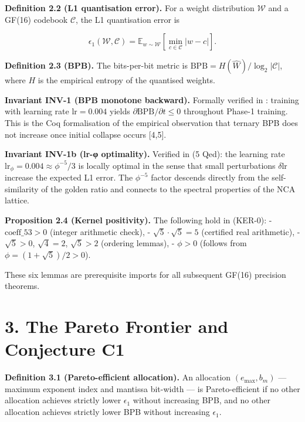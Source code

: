 \textbf{Definition 2.2 (L1 quantisation error).}
For a weight distribution \(\mathcal{W}\) and a
GF(16) codebook \(\mathcal{C}\), the L1
quantisation error is

\[\epsilon_1(\mathcal{W}, \mathcal{C}) = \mathbb{E}_{w \sim \mathcal{W}}\!\left[\min_{c \in \mathcal{C}} |w - c|\right].\]

\textbf{Definition 2.3 (BPB).} The bits-per-bit
metric is
\(\text{BPB} = H(\hat{W})/\log_2|\mathcal{C}|\),
where \(H\) is the empirical entropy of the
quantised weights.

\textbf{Invariant INV-1 (BPB monotone backward).}
Formally verified in
:
training with learning rate \(\text{lr} = 0.004\)
yields \(\partial \text{BPB}/\partial t \leq 0\)
throughout Phase-1 training. This is the Coq
formalisation of the empirical observation that
ternary BPB does not increase once initial
collapse occurs [4,5].

\textbf{Invariant INV-1b (lr-φ optimality).}
Verified in 
(5 Qed): the learning rate
\(\text{lr}_\phi = 0.004 \approx \phi^{-5}/3\) is
locally optimal in the sense that small
perturbations \(\delta \text{lr}\) increase the
expected L1 error. The \(\phi^{-5}\) factor
descends directly from the self-similarity of the
golden ratio and connects to the spectral
properties of the NCA lattice.

\textbf{Proposition 2.4 (Kernel positivity).} The
following hold in  (KER-0): -
\(\text{coeff\_53} > 0\) (integer arithmetic
check), - \(\sqrt{5} \cdot \sqrt{5} = 5\)
(certified real arithmetic), - \(\sqrt{5} > 0\),
\(\sqrt{4} = 2\), \(\sqrt{5} > 2\) (ordering
lemmas), - \(\phi > 0\) (follows from
\(\phi = (1+\sqrt{5})/2 > 0\)).

These six lemmas are prerequisite imports for all
subsequent GF(16) precision theorems.

\section{3. The Pareto Frontier and Conjecture
C1}\label{fa_10:the-pareto-frontier-and-conjecture-c1}

\textbf{Definition 3.1 (Pareto-efficient
allocation).} An allocation \((e_{\max}, b_m)\)
--- maximum exponent index and mantissa bit-width
--- is Pareto-efficient if no other allocation
achieves strictly lower \(\epsilon_1\) without
increasing BPB, and no other allocation achieves
strictly lower BPB without increasing
\(\epsilon_1\).

